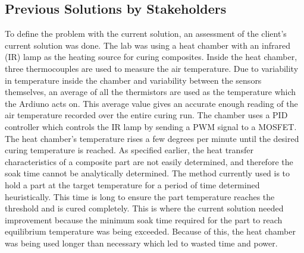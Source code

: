 \subsection{Previous Solutions by Stakeholders}
To define the problem with the current solution, an assessment of the client’s current solution was done. The lab was using a heat chamber with an infrared (IR) lamp as the heating source for curing composites. Inside the heat chamber, three thermocouples are used to measure the air temperature. Due to variability in temperature inside the chamber and variability between the sensors themselves, an average of all the thermistors are used as the temperature which the Ardiuno acts on. This average value gives an accurate enough reading of the air temperature recorded over the entire curing run. The chamber uses a PID controller which controls the IR lamp by sending a PWM signal to a MOSFET. The heat chamber’s temperature rises a few degrees per minute until the desired curing temperature is reached. As specified earlier, the heat transfer characteristics of a composite part are not easily determined, and therefore the soak time cannot be analytically determined. The method currently used is to hold a part at the target temperature for a period of time determined heuristically. This time is long to ensure the part temperature reaches the threshold and is cured completely. This is where the current solution needed improvement because the minimum soak time required for the part to reach equilibrium temperature was being exceeded. Because of this, the heat chamber was being used longer than necessary which led to wasted time and power.

